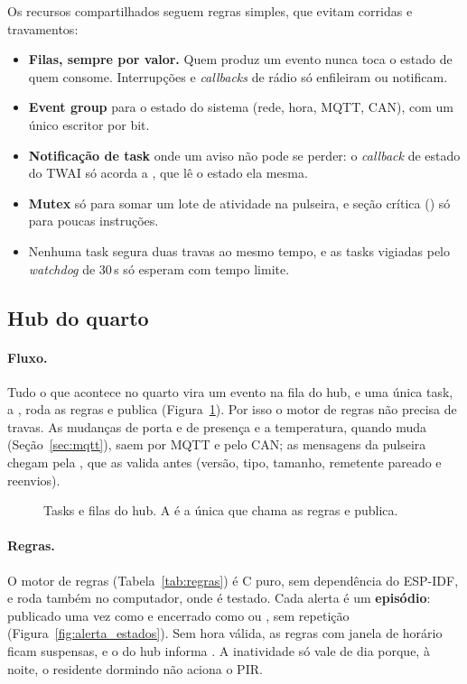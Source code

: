 Os recursos compartilhados seguem regras simples, que evitam corridas e travamentos:
\begin{itemize}
  \item \textbf{Filas, sempre por valor.} Quem produz um evento nunca toca o estado de quem
        consome. Interrupções e \textit{callbacks} de rádio só enfileiram ou notificam.
  \item \textbf{Event group} para o estado do sistema (rede, hora, MQTT, CAN), com um único
        escritor por bit.
  \item \textbf{Notificação de task} onde um aviso não pode se perder: o \textit{callback} de
        estado do TWAI só acorda a , que lê o estado ela mesma.
  \item \textbf{Mutex} só para somar um lote de atividade na pulseira, e seção crítica
        () só para poucas instruções.
  \item Nenhuma task segura duas travas ao mesmo tempo, e as tasks vigiadas pelo
        \textit{watchdog} de 30\,s só esperam com tempo limite.
\end{itemize}

\subsection{Hub do quarto}

\paragraph{Fluxo.} Tudo o que acontece no quarto vira um evento na fila do hub, e uma única
task, a , roda as regras e publica (Figura~\ref{fig:tasks_hub}). Por isso o
motor de regras não precisa de travas. As mudanças de porta e de presença e a temperatura,
quando muda (Seção~\ref{sec:mqtt}), saem por MQTT e pelo CAN; as mensagens da pulseira chegam
pela , que as
valida antes (versão, tipo, tamanho, remetente pareado e reenvios).

\begin{figure}[H]
\centering
\resizebox{\linewidth}{!}{}
\caption{Tasks e filas do hub. A  é a única que chama as regras e publica.}
\label{fig:tasks_hub}
\end{figure}

\paragraph{Regras.}\label{sec:regras} O motor de regras (Tabela~\ref{tab:regras}) é C puro,
sem dependência do ESP-IDF, e roda também no computador, onde é testado. Cada alerta é um
\textbf{episódio}: publicado uma vez como  e encerrado como  ou
, sem repetição (Figura~\ref{fig:alerta_estados}). Sem hora válida, as regras
com janela de horário ficam suspensas, e o  do hub informa
. A inatividade só vale de dia porque, à noite, o residente dormindo não
aciona o PIR.


